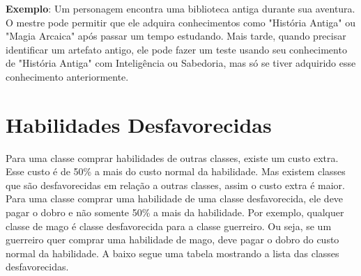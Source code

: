 \textbf{Exemplo}: Um personagem encontra uma biblioteca antiga durante sua aventura. O mestre pode permitir que ele adquira conhecimentos como "História Antiga" ou "Magia Arcaica" após passar um tempo estudando. Mais tarde, quando precisar identificar um artefato antigo, ele pode fazer um teste usando seu conhecimento de "História Antiga" com Inteligência ou Sabedoria, mas só se tiver adquirido esse conhecimento anteriormente.




\section{Habilidades Desfavorecidas}

Para uma classe comprar habilidades de outras classes, existe um custo extra. Esse custo é de 50\% a mais do custo normal da habilidade. Mas existem classes que são desfavorecidas em relação a outras classes, assim o custo extra é maior. Para uma classe comprar uma habilidade de uma classe desfavorecida, ele deve pagar o dobro e não somente 50\% a mais da habilidade. Por exemplo, qualquer classe de mago é classe desfavorecida para a classe guerreiro. Ou seja, se um guerreiro quer comprar uma habilidade de mago, deve pagar o dobro do custo normal da habilidade. A baixo segue uma tabela mostrando a lista das classes desfavorecidas.


